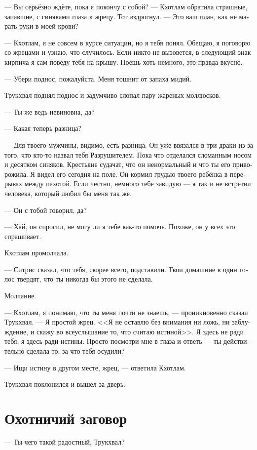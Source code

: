 \documentclass[a4paper,12pt,fleqn]{book}\usepackage{cooltooltips}\usepackage{polyglossia}\setdefaultlanguage[babelshorthands=true]{russian}\setotherlanguage{english}\defaultfontfeatures{Ligatures=TeX,Mapping=tex-text} \usepackage{xcolor}\definecolor{lightgray}{HTML}{bbbbbb}\color{lightgray}\newcommand{\ml}[3]{\textenglish{\textcolor{black}{#3}} }
\begin{document}
--- Вы серьёзно ждёте, пока я покончу с собой? --- Кхотлам обратила страшные, запавшие, с синяками глаза к жрецу.
Тот вздрогнул.
--- Это ваш план, как не марать руки в моей крови?

--- Кхотлам, я не совсем в курсе ситуации, но я тебя понял.
Обещаю, я поговорю со жрецами и узнаю, что случилось.
Если никто не вызовется, в следующий знак кирпича я сам поведу тебя на крышу.
Поешь хоть немного, это правда вкусно.

--- Убери поднос, пожалуйста.
Меня тошнит от запаха мидий.

Трукхвал поднял поднос и задумчиво слопал пару жареных моллюсков.

--- Ты же ведь невиновна, да?

--- Какая теперь разница?

--- Для твоего мужчины, видимо, есть разница.
Он уже ввязался в три драки из-за того, что кто-то назвал тебя Разрушителем.
Пока что отделался сломанным носом и десятком синяков.
Крестьяне судачат, что он ненормальный и что ты его приворожила.
Я видел его сегодня на поле.
Он кормил грудью твоего ребёнка в перерывах между пахотой.
Если честно, немного тебе завидую --- я так и не встретил человека, который любил бы меня так же.

--- Он с тобой говорил, да?

--- Хай, он спросил, не могу ли я тебе как-то помочь.
Похоже, он у всех это спрашивает.

Кхотлам промолчала.

--- Ситрис сказал, что тебя, скорее всего, подставили.
Твои домашние в один голос твердят, что ты никогда бы этого не сделала.

Молчание.

--- Кхотлам, я понимаю, что ты меня почти не знаешь, --- проникновенно сказал Трукхвал.
--- Я простой жрец.
<<Я не оставлю без внимания ни ложь, ни заблуждение, и скажу во всеуслышание то, что считаю истиной>>.
Я здесь не ради тебя, я здесь ради истины.
Просто посмотри мне в глаза и ответь --- ты действительно сделала то, за что тебя осудили?

--- Ищи истину в другом месте, жрец, --- ответила Кхотлам.

Трукхвал поклонился и вышел за дверь.

\section{Охотничий заговор}

--- Ты чего такой радостный, Трукхвал?
\end{document}
